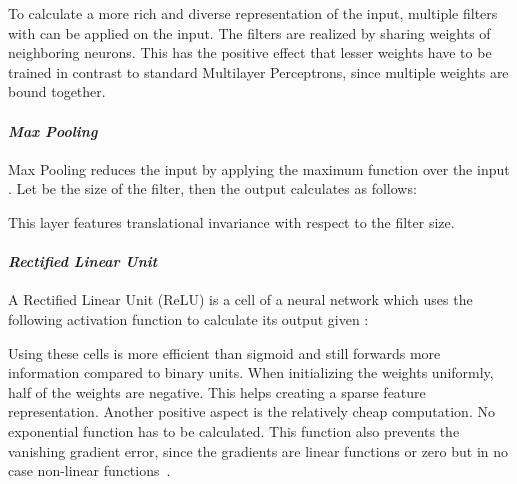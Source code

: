 \documentclass[10pt,journal,compsoc, hidelinks]{IEEEtran}
\newcommand{\paraV}{\vspace{1em}}
\begin{document}
\begin{center}
\begin{minipage}{0.8\columnwidth}

\end{minipage}
\end{center}

To calculate a more rich and diverse representation of the input, multiple filters  with  can be applied on the input. The filters  are realized by sharing weights of neighboring neurons. This has the positive effect that lesser weights have to be trained in contrast to standard Multilayer Perceptrons, since multiple weights are bound together.



\paraV
\paragraph{\textit{Max Pooling}}

Max Pooling reduces the input by applying the maximum function over the input . Let  be the size of the filter, then the output calculates as follows:


\begin{center}
\begin{minipage}{1\columnwidth}

\end{minipage}
\end{center}

This layer features translational invariance with respect to the filter size.

\paraV
\paragraph{\textit{Rectified Linear Unit}}
A Rectified Linear Unit (ReLU) is a cell of a neural network which uses the following activation function to calculate its output given :


\begin{center}
\begin{minipage}{0.44\columnwidth}

\end{minipage}
\end{center}


Using these cells is more efficient than sigmoid and still forwards more information compared to binary units. When initializing the weights uniformly, half of the weights are negative. This helps creating a sparse feature representation. Another positive aspect is the relatively cheap computation. No exponential function has to be calculated. This function also prevents the vanishing gradient error, since the gradients are linear functions or zero but in no case non-linear functions~\cite{AISTATS2011_GlorotBB11}.
\end{document}
